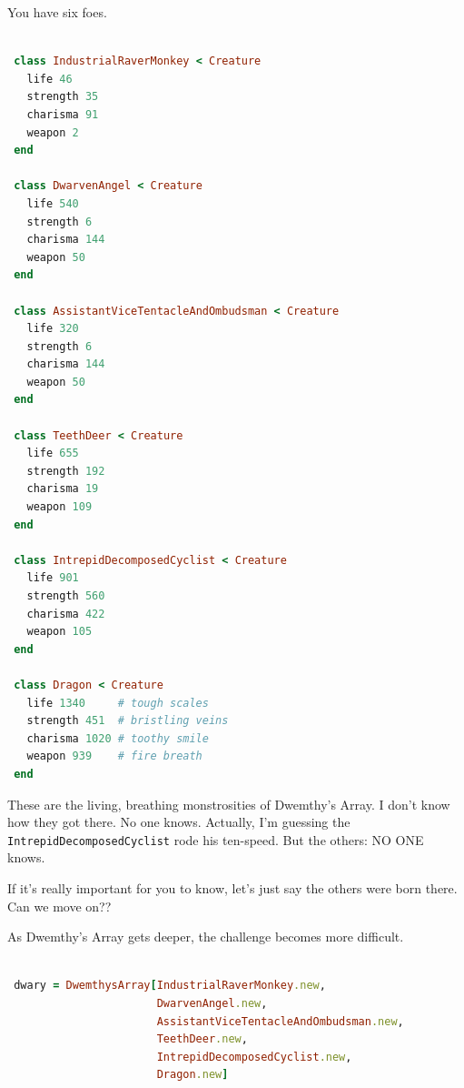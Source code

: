 \documentclass[10pt,twoside]{report}
\begin{document}
You have six foes.


\begin{lstlisting}[basicstyle=\ttfamily\color{basiccolor},
    commentstyle = \ttfamily\color{commentcolor},
    keywordstyle=\ttfamily\color{keywordscolor},
    stringstyle=\color{stringcolor},
    language=Ruby,
    basicstyle=\small\ttfamily,
    showstringspaces=false,
  ]

 class IndustrialRaverMonkey < Creature
   life 46
   strength 35
   charisma 91
   weapon 2
 end

 class DwarvenAngel < Creature
   life 540
   strength 6
   charisma 144
   weapon 50
 end

 class AssistantViceTentacleAndOmbudsman < Creature
   life 320
   strength 6
   charisma 144
   weapon 50
 end

 class TeethDeer < Creature
   life 655
   strength 192
   charisma 19
   weapon 109
 end

 class IntrepidDecomposedCyclist < Creature
   life 901
   strength 560
   charisma 422
   weapon 105
 end

 class Dragon < Creature
   life 1340     # tough scales
   strength 451  # bristling veins
   charisma 1020 # toothy smile
   weapon 939    # fire breath
 end

\end{lstlisting}


These are the living, breathing monstrosities of Dwemthy's Array.  I
don't know how they got there.  No one knows.  Actually, I'm guessing
the \lstinline[breaklines=true]|IntrepidDecomposedCyclist| rode his
ten-speed.  But the others: NO ONE knows.

If it's really important for you to know, let's just say the others
were born there. Can we move on??

As Dwemthy's Array gets deeper, the challenge becomes more difficult.


\begin{lstlisting}[basicstyle=\ttfamily\color{basiccolor},
    commentstyle = \ttfamily\color{commentcolor},
    keywordstyle=\ttfamily\color{keywordscolor},
    stringstyle=\color{stringcolor},
    language=Ruby,
    basicstyle=\small\ttfamily,
    showstringspaces=false,
  ]

 dwary = DwemthysArray[IndustrialRaverMonkey.new,
                       DwarvenAngel.new,
                       AssistantViceTentacleAndOmbudsman.new,
                       TeethDeer.new,
                       IntrepidDecomposedCyclist.new,
                       Dragon.new]

\end{lstlisting}
\end{document}
